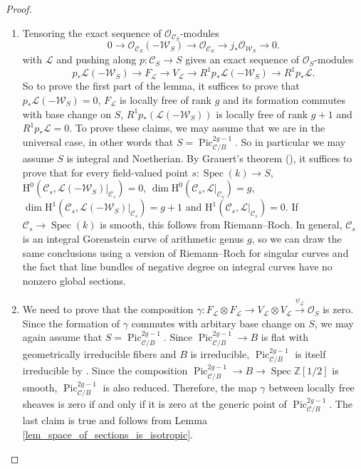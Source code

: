 \documentclass{article} %
\numberwithin{equation}{section}
\DeclareMathOperator{\Spec}{Spec}
\DeclareMathOperator{\Pic}{Pic}
\newcommand{\sh}[1]{\mathscr{#1}}
\renewcommand{\O}{\mathcal{O}}
\newcommand{\HH}{\mathrm{H}}
\newcommand{\Z}{\mathbb{Z}}
\begin{document}
\begin{proof}
\begin{enumerate}
    \item Tensoring the exact sequence of $\O_{\mathcal{C}_S}$-modules
    \[
    0\rightarrow \O_{\mathcal{C}_S}(-\mathcal{W}_S)\rightarrow \O_{\mathcal{C}_S}\rightarrow j_*\O_{\mathcal{W}_S}\rightarrow 0.
    \]
    with $\sh{L}$ and pushing along $p\colon \mathcal{C}_S\rightarrow S$ gives an exact sequence of $\O_S$-modules
    \[
    p_*\sh{L}(-\mathcal{W}_S) \rightarrow F_{\sh{L}} \rightarrow V_{\sh{L}}\rightarrow R^1p_*\sh{L}(-\mathcal{W}_S)\rightarrow R^1p_*\sh{L}.
    \]
    So to prove the first part of the lemma, it suffices to prove that $p_*\sh{L}(-\mathcal{W}_S)=0$, $F_{\sh{L}}$ is locally free of rank $g$ and its formation commutes with base change on $S$, $R^1p_*(\sh{L}(-\mathcal{W}_S))$ is locally free of rank $g+1$ and $R^1p_*\sh{L}=0$.
    To prove these claims, we may assume that we are in the universal case, in other words that $S = \Pic_{\mathcal{C}/B}^{2g-1}$.
    So in particular we may assume $S$ is integral and Noetherian.
    By Grauert's theorem (\cite[Corollary 12.9, Proposition 12.5]{Harthshorne-AG}), it suffices to prove that for every field-valued point $s\colon \Spec(k) \rightarrow S$, $\HH^0(\mathcal{C}_s, \sh{L}(-\mathcal{W}_S)|_{\mathcal{C}_s}) = 0$, $\dim \HH^0(\mathcal{C}_s, \sh{L}|_{\mathcal{C}_s}) = g$, $\dim \HH^1(\mathcal{C}_s, \sh{L}(-\mathcal{W}_S)|_{\mathcal{C}_s}) = g+1$ and $\HH^1(\mathcal{C}_s, \sh{L}|_{\mathcal{C}_s}) = 0$.
    If $\mathcal{C}_s\rightarrow \Spec(k)$ is smooth, this follows from Riemann--Roch. 
    In general, $\mathcal{C}_s$ is an integral Gorenstein curve of arithmetic genus $g$, so we can draw the same conclusions using a version of Riemann--Roch for singular curves \cite[Tag \href{https://stacks.math.columbia.edu/tag/0BS6}{0BS6}]{stacks-project} and the fact that line bundles of negative degree on integral curves have no nonzero global sections. 
    \item We need to prove that the composition $\gamma\colon F_{\sh{L}} \otimes F_{\sh{L}} \rightarrow V_{\sh{L}} \otimes V_{\sh{L}} \xrightarrow{\psi_{\sh{L}}}\O_S$ is zero. 
    Since the formation of $\gamma$ commutes with arbitary base change on $S$, we may again assume that $S = \Pic_{\mathcal{C}/B}^{2g-1}$.
    Since $\Pic_{\mathcal{C}/B}^{2g-1}\rightarrow B$ is flat with geometrically irreducible fibers and $B$ is irreducible, $\Pic_{\mathcal{C}/B}^{2g-1}$ is itself irreducible by \cite[Tag \href{https://stacks.math.columbia.edu/tag/004Z}{004Z}]{stacks-project}. 
    Since the composition $\Pic_{\mathcal{C}/B}^{2g-1}\rightarrow B\rightarrow \Spec \Z[1/2]$ is smooth, $\Pic_{\mathcal{C}/B}^{2g-1}$ is also reduced. 
    Therefore, the map $\gamma$ between locally free sheaves is zero if and only if it is zero at the generic point of $\Pic_{\mathcal{C}/B}^{2g-1}$.
    The last claim is true and follows from Lemma \ref{lem_space_of_sections_is_isotropic}.
\end{enumerate}
\end{proof}
\end{document}
